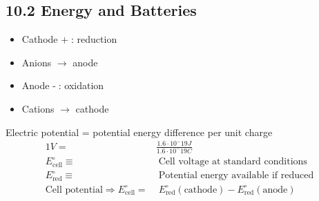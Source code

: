 \subsection{10.2 Energy and Batteries}
    \begin{minipage}{34mm}
        \begin{itemize}
            \item Cathode \textcircled{+}: reduction
            \item Anions $\rightarrow$ anode
        \end{itemize}
    \end{minipage}
    \begin{minipage}{31mm}
        \begin{itemize}
            \item Anode \textcircled{-}: oxidation
            \item Cations $\rightarrow$ cathode
        \end{itemize}
    \end{minipage}

    Electric potential = potential energy difference per unit charge
    \begin{align*}
        1V =& \frac{1.6 \cdot 10^-19 J}{1.6 \cdot 10^-19 C}\\
        E^\circ_\text{cell} \equiv& \; \text{Cell voltage at standard conditions}\\
        E^\circ_\text{red} \equiv& \; \text{Potential energy available if reduced}\\
        \text{Cell potential} \Rightarrow E^\circ_\text{cell} =& \; E^\circ_\text{red}(\text{cathode}) - E^\circ_\text{red}(\text{anode})
    \end{align*}